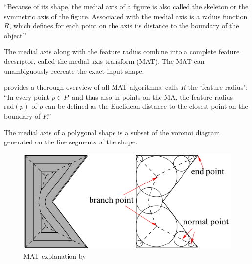 ``Because of its shape, the medial axis of a figure is also called the skeleton or the symmetric axis of the figure.
Associated with the medial axis is a radius function $R$, which defines for each point on the axis its distance to the boundary of the object.''
\cite{lee1982medial}

The medial axis along with the feature radius combine into a complete feature decsriptor, called the medial axis transform (MAT).
The MAT can unambiguously recreate the exact input shape. 

\cite{Moesen2011} provides a thorough overview of all MAT algorithms.
\cite{Moesen2011} calls $R$ the `feature radius': ``In every point $p \in P$, and thus also in points on the MA, the feature radius $\text{rad}(p)$ of $p$ can be defined as the Euclidean distance to the closest point on the boundary of $P$.''

The medial axis of a polygonal shape is a subset of the voronoi diagram generated on the line segments of the shape. 


\begin{figure}
\centering
\includegraphics[width=.9\columnwidth]{sources/intro/medial_axis_Kao.png}
\caption{MAT explanation by \citeauthor{kao1998optimal}}
\label{MAT_explanation}
\end{figure}



